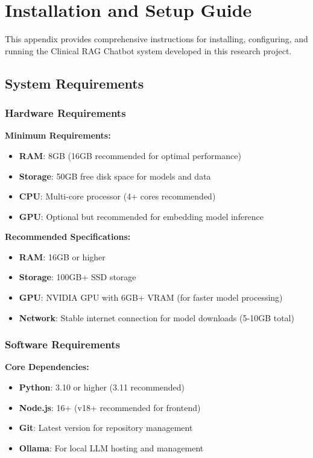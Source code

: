 \chapter{Installation and Setup Guide}
\label{appendix:setup}

This appendix provides comprehensive instructions for installing, configuring, and running the Clinical RAG Chatbot system developed in this research project.

\section{System Requirements}

\subsection{Hardware Requirements}

\textbf{Minimum Requirements:}
\begin{itemize}
    \item \textbf{RAM}: 8GB (16GB recommended for optimal performance)
    \item \textbf{Storage}: 50GB free disk space for models and data
    \item \textbf{CPU}: Multi-core processor (4+ cores recommended)
    \item \textbf{GPU}: Optional but recommended for embedding model inference
\end{itemize}

\textbf{Recommended Specifications:}
\begin{itemize}
    \item \textbf{RAM}: 16GB or higher
    \item \textbf{Storage}: 100GB+ SSD storage
    \item \textbf{GPU}: NVIDIA GPU with 6GB+ VRAM (for faster model processing)
    \item \textbf{Network}: Stable internet connection for model downloads (5-10GB total)
\end{itemize}

\subsection{Software Requirements}

\textbf{Core Dependencies:}
\begin{itemize}
    \item \textbf{Python}: 3.10 or higher (3.11 recommended)
    \item \textbf{Node.js}: 16+ (v18+ recommended for frontend)
    \item \textbf{Git}: Latest version for repository management
    \item \textbf{Ollama}: For local LLM hosting and management
\end{itemize}

